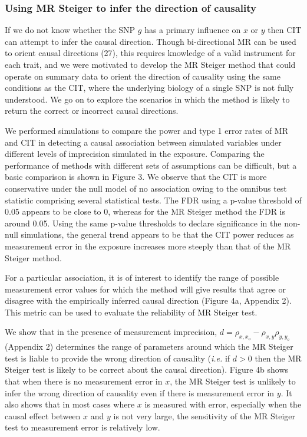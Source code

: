 \documentclass[]{article}
\begin{document}
\subsubsection{Using MR Steiger to infer the direction of
causality}\label{using-mr-steiger-to-infer-the-direction-of-causality}

If we do not know whether the SNP \(g\) has a primary influence on \(x\)
or \(y\) then CIT can attempt to infer the causal direction. Though
bi-directional MR can be used to orient causal directions (27), this
requires knowledge of a valid instrument for each trait, and we were
motivated to develop the MR Steiger method that could operate on summary
data to orient the direction of causality using the same conditions as
the CIT, where the underlying biology of a single SNP is not fully
understood. We go on to explore the scenarios in which the method is
likely to return the correct or incorrect causal directions.

We performed simulations to compare the power and type 1 error rates of
MR and CIT in detecting a causal association between simulated variables
under different levels of imprecision simulated in the exposure.
Comparing the performance of methods with different sets of assumptions
can be difficult, but a basic comparison is shown in Figure 3. We
observe that the CIT is more conservative under the null model of no
association owing to the omnibus test statistic comprising several
statistical tests. The FDR using a p-value threshold of 0.05 appears to
be close to 0, whereas for the MR Steiger method the FDR is around 0.05.
Using the same p-value thresholds to declare significance in the
non-null simulations, the general trend appears to be that the CIT power
reduces as measurement error in the exposure increases more steeply than
that of the MR Steiger method.

For a particular association, it is of interest to identify the range of
possible measurement error values for which the method will give results
that agree or disagree with the empirically inferred causal direction
(Figure 4a, Appendix 2). This metric can be used to evaluate the
reliability of MR Steiger test.

We show that in the presence of measurement imprecision,
\(d = \rho_{x, x_o} - \rho_{x,y}\rho_{y,y_o}\) (Appendix 2) determines
the range of parameters around which the MR Steiger test is liable to
provide the wrong direction of causality (\emph{i.e.} if \(d>0\) then
the MR Steiger test is likely to be correct about the causal direction).
Figure 4b shows that when there is no measurement error in \(x\), the MR
Steiger test is unlikely to infer the wrong direction of causality even
if there is measurement error in \(y\). It also shows that in most cases
where \(x\) is measured with error, especially when the causal effect
between \(x\) and \(y\) is not very large, the sensitivity of the MR
Steiger test to measurement error is relatively low.
\end{document}

